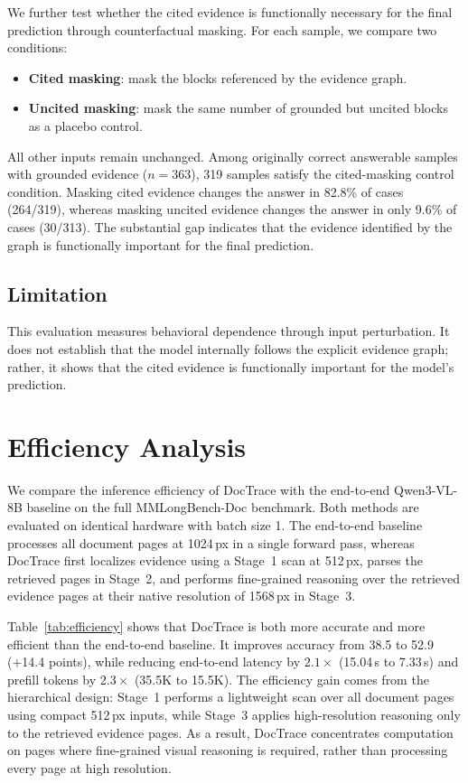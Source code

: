 \documentclass[letterpaper]{article} %
\begin{document}
We further test whether the cited evidence is functionally necessary for the final prediction through counterfactual masking. For each sample, we compare two conditions:

\begin{itemize}
\item \textbf{Cited masking}: mask the blocks referenced by the evidence graph.
\item \textbf{Uncited masking}: mask the same number of grounded but uncited blocks as a placebo control.
\end{itemize}

All other inputs remain unchanged. Among originally correct answerable samples with grounded evidence ($n=363$), 319 samples satisfy the cited-masking control condition. Masking cited evidence changes the answer in 82.8\% of cases (264/319), whereas masking uncited evidence changes the answer in only 9.6\% of cases (30/313). The substantial gap indicates that the evidence identified by the graph is functionally important for the final prediction.

\subsection{Limitation}

This evaluation measures behavioral dependence through input perturbation. It does not establish that the model internally follows the explicit evidence graph; rather, it shows that the cited evidence is functionally important for the model's prediction.



\section{Efficiency Analysis}

We compare the inference efficiency of DocTrace with the end-to-end Qwen3-VL-8B baseline on the full MMLongBench-Doc benchmark. Both methods are evaluated on identical hardware with batch size 1. The end-to-end baseline processes all document pages at 1024\,px in a single forward pass, whereas DocTrace first localizes evidence using a Stage~1 scan at 512\,px, parses the retrieved pages in Stage~2, and performs fine-grained reasoning over the retrieved evidence pages at their native resolution of 1568\,px in Stage~3.

Table~\ref{tab:efficiency} shows that DocTrace is both more accurate and more efficient than the end-to-end baseline. It improves accuracy from 38.5 to 52.9 (+14.4 points), while reducing end-to-end latency by $2.1\times$ (15.04\,s to 7.33\,s) and prefill tokens by $2.3\times$ (35.5K to 15.5K). The efficiency gain comes from the hierarchical design: Stage~1 performs a lightweight scan over all document pages using compact 512\,px inputs, while Stage~3 applies high-resolution reasoning only to the retrieved evidence pages. As a result, DocTrace concentrates computation on pages where fine-grained visual reasoning is required, rather than processing every page at high resolution.
\end{document}

